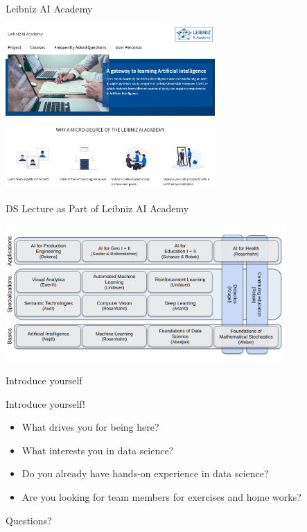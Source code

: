 \documentclass[aspectratio=169]{../latex_main/tntbeamer}  %
\begin{document}
\begin{frame}[c]{Leibniz AI Academy}

\centering
\includegraphics[width=0.6\textwidth]{figures/leibniz_ai_academy.png}

\end{frame}
\begin{frame}[c]{DS Lecture as Part of Leibniz AI Academy}

\centering
\includegraphics[width=0.8\textwidth]{figures/LAI-New-Blue.png}

\end{frame}
\begin{frame}[c]{Introduce yourself}


\begin{center}
\huge
    Introduce yourself!
\end{center}

\begin{itemize}
    \item What drives you for being here?
    \item What interests you in data science?
    \item Do you already have hands-on experience in data science?
    \item Are you looking for team members for exercises and home works?
\end{itemize}

\end{frame}


\begin{frame}[c]{}

\centering
\huge
Questions?

\end{frame}

	
\end{document}
